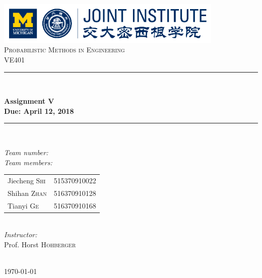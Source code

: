 \begin{titlepage}

\newcommand{\HRule}{\rule{\linewidth}{0.5mm}}

\center

\includegraphics[height=0.8in]{images/logo.png}\\[1cm]

\textsc{\Large Probabilistic Methods in Engineering}\\[0.4cm]
\textsc{\large VE401}\\[0.4cm]

\HRule \\[0.4cm]
{
    \bfseries
    {\huge Assignment V}\\[0.3cm]
    {\large Due: April 12, 2018}\\[0.2cm]
    \HRule \\[1.5cm]
}

\begin{minipage}{0.4\textwidth}

\large
\emph{Team number:} \quad{}\\

\emph{Team members:}\\

\begin{tabular}{ll}
    Jiecheng  \textsc{Shi} & 515370910022\\
    Shihan  \textsc{Zhan} & 516370910128\\
    Tianyi  \textsc{Ge} & 516370910168\\
\end{tabular}\\[1cm]


\emph{Instructor:}\\[0.1cm]
Prof. Horst \textsc{Hohberger}

\end{minipage}\\[2cm]

{\large \today}\\[2cm]

\vfill

\end{titlepage}

\clearpage